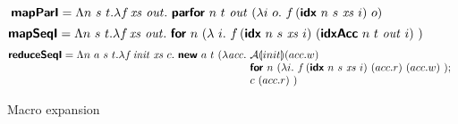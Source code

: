 \begin{figure}
\begin{displaymath}
    \bm{\mathsf{mapParI}}
    =
    \Lambda n~s~t.\lambda f\,\mathit{xs}~\mathit{out}.~
    \bm{\mathsf{parfor}}~n~t~\mathit{out}~(\lambda i~o.~f\,(\bm{\mathsf{idx}}~n~s~\mathit{xs}~i)~o)
  \end{displaymath}
  \begin{displaymath}
    \bm{\mathsf{mapSeqI}}
    =
    \Lambda n~s~t.\lambda f\,\mathit{xs}~\mathit{out}.~
    \bm{\mathsf{for}}~n~(\lambda~i.~f\,(\bm{\mathsf{idx}}~n~s~\mathit{xs}~i)~(\bm{\mathsf{idxAcc}}~n~t~\mathit{out}~i)\ )
  \end{displaymath}
  \begin{displaymath}
    \prim{reduceSeqI}
    =
    \Lambda n~a~\dtone~\dttwo.\lambda f\,\mathit{init}~\mathit{xs}~c.~\prim{new}~a~\dttwo~(\lambda \mathit{acc}.~
      \begin{array}[t]{@{}l}
      \semA{init}(acc.w)\\
      \prim{for}~n~(\lambda i.~f\,(\ei)~(acc.r)~(acc.w)\ );\\
      c~(acc.r)\ )
      \end{array}
\end{displaymath}
\caption{Macro expansion}  
\end{figure}